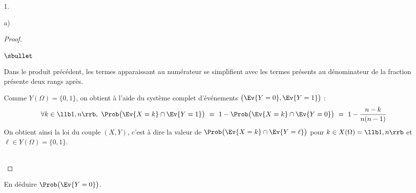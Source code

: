 \documentclass[11pt]{article}%
\begin{document}
\begin{noliste}{1.}
\begin{noliste}{a)}
\begin{proof}
\begin{noliste}{$\sbullet$}
        
      \item Dans le produit précédent, les termes apparaissant au
        numérateur se simplifient avec les termes présents au
        dénominateur de la fraction présente deux rangs après.
      \end{noliste}
      \begin{remarkL}{1}
        Comme $Y(\Omega) = \{0, 1\}$, on obtient à l'aide du système
        complet d'événements $\big( \Ev{Y = 0}, \Ev{Y = 1} \big)$ :        
        \[
        \forall k \in \llb 1, n \rrb, \ \Prob\big( \Ev{X = k} \cap
        \Ev{Y = 1} \big) \ = \ 1 - \Prob\big( \Ev{X = k} \cap \Ev{Y =
          0} \big) \ = \ 1 - \dfrac{n - k}{n (n-1)}
        \]
        On obtient ainsi la loi du couple $(X, Y)$, c'est à dire la
        valeur de $\Prob\big( \Ev{X = k} \cap \Ev{Y = \ell} \big)$
        pour $k \in X(\Omega) = \llb 1, n \rrb$ et $\ell \in Y(\Omega)
        = \{ 0, 1 \}$.
      \end{remarkL}~\\[-1.4cm] 
    \end{proof}

  \item En déduire $\Prob\big( \Ev{Y = 0} \big)$.


\end{noliste}
\end{noliste}
\end{document}
